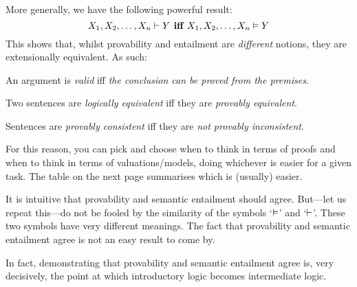 More generally, we have the following powerful result:
$$X_1, X_2, \ldots, X_n \vdash Y \textbf{ iff }X_1, X_2, \ldots, X_n \vDash Y$$
This shows that, whilst provability and entailment are \emph{different} notions, they are extensionally equivalent. As such:
	\begin{ebullet}
		\item An argument is \emph{valid} iff \emph{the conclusion can be proved from the premises}.
		\item Two sentences are \emph{logically equivalent} iff they are \emph{provably equivalent}.
		\item Sentences are \emph{provably consistent} iff they are \emph{not provably inconsistent}.
	\end{ebullet}
For this reason, you can pick and choose when to think in terms of proofs and when to think in terms of valuations/models, doing whichever is easier for a given task. The table on the next page summarises which is (usually) easier.

It is intuitive that provability and semantic entailment should agree. But---let us repeat this---do not be fooled by the similarity of the symbols `$\vDash$' and `$\vdash$'. These two symbols have very different meanings. The fact that provability and semantic entailment agree is not an easy result to come by.

In fact, demonstrating that provability and semantic entailment agree is, very decisively, the point at which introductory logic becomes intermediate logic.

